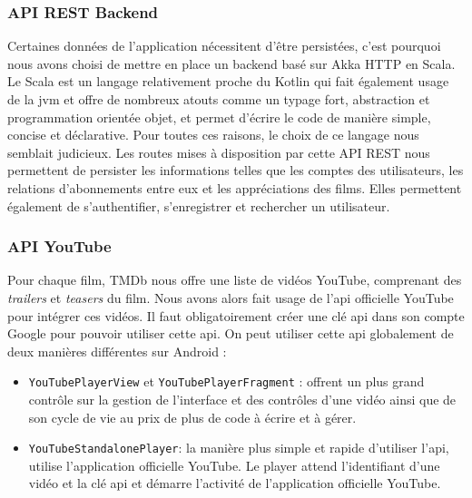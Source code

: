 \subsubsection{API REST Backend}
Certaines données de l'application nécessitent d'être persistées, c'est pourquoi nous avons choisi de mettre en place un backend basé sur Akka HTTP \cite{akka} en Scala. Le Scala est un langage relativement proche du Kotlin qui fait également usage de la \acrshort{jvm} et offre de nombreux atouts comme un typage fort, abstraction et programmation orientée objet, et permet d'écrire le code de manière simple, concise et déclarative. Pour toutes ces raisons, le choix de ce langage nous semblait judicieux. Les routes mises à disposition par cette API REST nous permettent de persister les informations telles que les comptes des utilisateurs, les relations d'abonnements entre eux et les appréciations des films. Elles permettent également de s'authentifier, s'enregistrer et rechercher un utilisateur.

\subsubsection{API YouTube}
Pour chaque film, TMDb nous offre une liste de vidéos YouTube, comprenant des \textit{trailers} et \textit{teasers} du film. Nous avons alors fait usage de l'\acrshort{api} officielle YouTube \cite{youtube} pour intégrer ces vidéos. Il faut obligatoirement créer une clé \acrshort{api} dans son compte Google pour pouvoir utiliser cette \acrshort{api}. On peut utiliser cette \acrshort{api} globalement de deux manières différentes sur Android :
\begin{itemize}
    \item \texttt{YouTubePlayerView} et \texttt{YouTubePlayerFragment} : offrent un plus grand contrôle sur la gestion de l'interface et des contrôles d'une vidéo ainsi que de son cycle de vie au prix de plus de code à écrire et à gérer.
    \item \texttt{YouTubeStandalonePlayer}: la manière plus simple et rapide d'utiliser l'\acrshort{api}, utilise l'application officielle YouTube. Le player attend l'identifiant d'une vidéo et la clé \acrshort{api} et démarre l'activité de l'application officielle YouTube.
\end{itemize}

